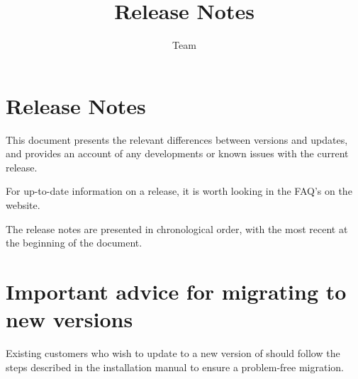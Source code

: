 
\title{\app{} Release Notes}
\author*{\app{} Team}{}
\maketitle

\setcounter{secnumdepth}{0}

\clearpage
\section{\app{} Release Notes}
This document presents the relevant differences between versions and updates, and provides an account of any developments or known issues with the current release. 

For up-to-date information on a release, it is worth looking in the FAQ's on the \app{} website. 

The release notes are presented in chronological order, with the most recent at the beginning of the document.  

\section{Important advice for migrating to new \app{} versions}
Existing customers who wish to update to a new version of \app{} should follow the steps described in the installation manual to ensure a problem-free migration.






